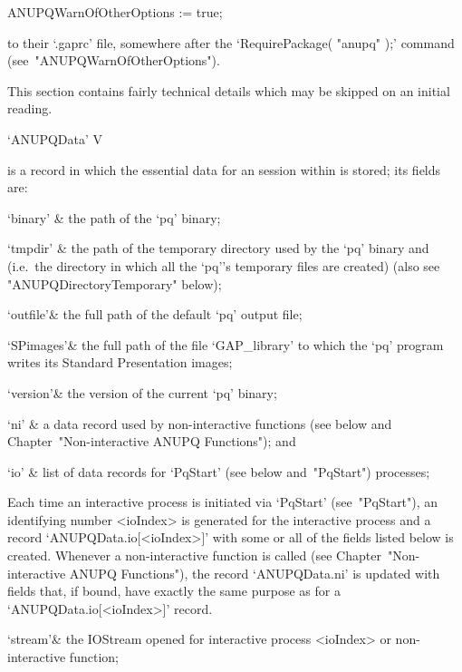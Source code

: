 \begintt
ANUPQWarnOfOtherOptions := true;
\endtt

to their `.gaprc' file, somewhere after the  `RequirePackage( "anupq" );'
command (see~"ANUPQWarnOfOtherOptions").


This section contains fairly technical details which may be skipped on an
initial reading.

\>`ANUPQData' V

is a {\GAP} record in which the essential data for  an  {\ANUPQ}  session
within {\GAP} is stored; its fields are:

\beginitems

\quad`binary' & the path of the `pq' binary;

\quad`tmpdir' & the path of the temporary  directory  used  by  the  `pq'
binary and {\GAP} (i.e.~the directory in which all the  `pq''s  temporary
files are created) (also see "ANUPQDirectoryTemporary" below);

\quad`outfile'& the full path of the default `pq' output  file;

\quad`SPimages'& the full path of the file  `GAP_library'  to  which  the
`pq' program writes its Standard Presentation images;

\quad`version'& the version of the current `pq' binary;

\quad`ni' & a data record used by non-interactive  functions  (see  below
and Chapter~"Non-interactive ANUPQ Functions"); and

\quad`io' & list of data records for `PqStart' (see below  and~"PqStart")
processes;

\enditems

Each time an interactive {\ANUPQ}  process  is  initiated  via  `PqStart'
(see~"PqStart"), an identifying number <ioIndex>  is  generated  for  the
interactive process and a record `ANUPQData.io[<ioIndex>]' with  some  or
all of the fields listed below is  created.  Whenever  a  non-interactive
function is called (see Chapter~"Non-interactive ANUPQ  Functions"),  the
record `ANUPQData.ni' is updated with fields that, if bound, have exactly
the same purpose as for a `ANUPQData.io[<ioIndex>]' record. 

\beginitems

\quad`stream'& the  IOStream  opened  for  interactive  {\ANUPQ}  process
<ioIndex> or non-interactive {\ANUPQ} function;

